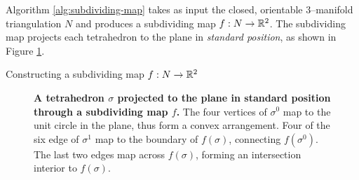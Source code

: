 Algorithm \ref{alg:subdividing-map} takes as input the closed, orientable 3--manifold triangulation $N$ and produces a subdividing map $f:N\to\mathbb{R}^2$.
The subdividing map projects each tetrahedron to the plane in \emph{standard position}, as shown in Figure \ref{fig:standard-position}.

\begin{algorithm}
	\caption{Constructing a subdividing map $f:N\to\mathbb{R}^2$}
	\label{alg:subdividing-map}
\end{algorithm}

\begin{figure}[h!]
	\caption{
		\textbf{A tetrahedron $\sigma$ projected to the plane in standard position through a subdividing map $f$.}
		The four vertices of $\sigma^0$ map to the unit circle in the plane, thus form a convex arrangement.
		Four of the six edge of $\sigma^1$ map to the boundary of $f(\sigma)$, connecting $f(\sigma^0)$.
		The last two edges map across $f(\sigma)$, forming an intersection interior to $f(\sigma)$.
	}
	\label{fig:standard-position}
\end{figure}

